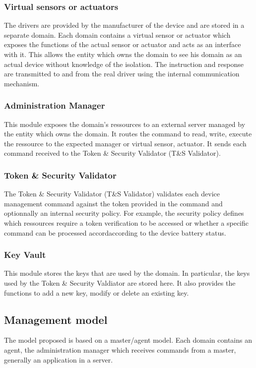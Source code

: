 \documentclass[conference]{IEEEtran}
\begin{document}
\subsubsection{Virtual sensors or actuators}
\label{sec:virtual_sensor}
The drivers are provided by the manufacturer of the device and are stored in a separate domain. Each domain contains a virtual sensor or actuator which exposes the functions of the actual sensor or actuator and acts as an interface with it. This allows the entity which owns the domain to see his domain as an actual device without knowledge of the isolation. The instruction and response are transmitted to and from the real driver using the internal communication mechanism.  

\subsubsection{Administration Manager}
\label{sec:Admin_Mgr}
This module exposes the domain's ressources to an external server managed by the entity which owns the domain. It routes the command to read, write, execute the ressource to the expected manager or virtual sensor, actuator. It sends each command received to the Token \& Security Validator (T\&S Validator). 

\subsubsection{Token \& Security Validator}
\label{sec:Token_Validator}
The Token \& Security Validator (T\&S Validator) validates each device management command against the token provided in the command and optionnally an internal security policy. For example, the security policy defines which ressources require a token verification to be accessed or whether a specific command can be processed accordaccording to the device battery status. 

\subsubsection{Key Vault}
\label{sec:Key_Vault}
This module stores the keys that are used by the domain. In particular, the keys used by the Token \& Security Valdiator are stored here. It also provides the functions to add a new key, modify or delete an existing key.

\subsection{Management model}
\label{sec:Management_model}
The model proposed is based on a master/agent model. Each domain contains an agent, the administration manager which receives commands from a master, generally an application in a server.
\end{document}
